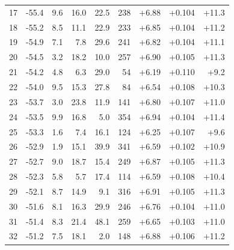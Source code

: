 \begin{longtable}{@{}r r r r r r r r r@{}}
17 & -55.4 & 9.6 & 16.0 & 22.5 & 238 & \cellcolor{green!69}+6.88 & \cellcolor{yellow!65}+0.104 & \cellcolor{orange!69}+11.3 \\
18 & -55.2 & 8.5 & 11.1 & 22.9 & 233 & \cellcolor{green!69}+6.85 & \cellcolor{yellow!65}+0.104 & \cellcolor{orange!69}+11.2 \\
19 & -54.9 & 7.1 & 7.8 & 29.6 & 241 & \cellcolor{green!69}+6.82 & \cellcolor{yellow!65}+0.104 & \cellcolor{orange!68}+11.1 \\
20 & -54.5 & 3.2 & 18.2 & 10.0 & 257 & \cellcolor{green!70}+6.90 & \cellcolor{yellow!65}+0.105 & \cellcolor{orange!69}+11.3 \\
21 & -54.2 & 4.8 & 6.3 & 29.0 & 54 & \cellcolor{green!64}+6.19 & \cellcolor{yellow!68}+0.110 & \cellcolor{orange!59}+9.2 \\
22 & -54.0 & 9.5 & 15.3 & 27.8 & 84 & \cellcolor{green!67}+6.54 & \cellcolor{yellow!67}+0.108 & \cellcolor{orange!64}+10.3 \\
23 & -53.7 & 3.0 & 23.8 & 11.9 & 141 & \cellcolor{green!69}+6.80 & \cellcolor{yellow!66}+0.107 & \cellcolor{orange!68}+11.0 \\
24 & -53.5 & 9.9 & 16.8 & 5.0 & 354 & \cellcolor{green!70}+6.94 & \cellcolor{yellow!65}+0.104 & \cellcolor{orange!70}+11.4 \\
25 & -53.3 & 1.6 & 7.4 & 16.1 & 124 & \cellcolor{green!64}+6.25 & \cellcolor{yellow!66}+0.107 & \cellcolor{orange!61}+9.6 \\
26 & -52.9 & 1.9 & 15.1 & 39.9 & 341 & \cellcolor{green!67}+6.59 & \cellcolor{yellow!64}+0.102 & \cellcolor{orange!67}+10.9 \\
27 & -52.7 & 9.0 & 18.7 & 15.4 & 249 & \cellcolor{green!69}+6.87 & \cellcolor{yellow!65}+0.105 & \cellcolor{orange!69}+11.3 \\
28 & -52.3 & 5.8 & 5.7 & 17.4 & 114 & \cellcolor{green!67}+6.59 & \cellcolor{yellow!67}+0.108 & \cellcolor{orange!65}+10.4 \\
29 & -52.1 & 8.7 & 14.9 & 9.1 & 316 & \cellcolor{green!70}+6.91 & \cellcolor{yellow!65}+0.105 & \cellcolor{orange!69}+11.3 \\
30 & -51.6 & 8.1 & 16.3 & 29.9 & 246 & \cellcolor{green!68}+6.76 & \cellcolor{yellow!65}+0.104 & \cellcolor{orange!68}+11.0 \\
31 & -51.4 & 8.3 & 21.4 & 48.1 & 259 & \cellcolor{green!68}+6.65 & \cellcolor{yellow!64}+0.103 & \cellcolor{orange!68}+11.0 \\
32 & -51.2 & 7.5 & 18.1 & 2.0 & 148 & \cellcolor{green!69}+6.88 & \cellcolor{yellow!66}+0.106 & \cellcolor{orange!69}+11.2 \\

\end{longtable}
